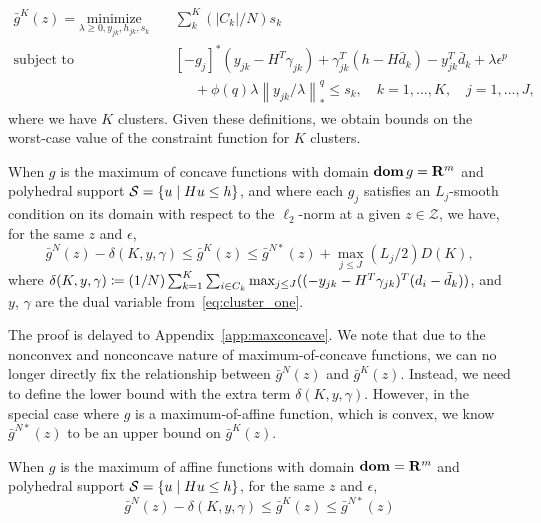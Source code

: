{{\begin{equation}
	\tag{MRO-K-Dual}
	\label{eq:cluster_dual}
	\begin{aligned}
		\bar{g}^K(z) = \underset{\lambda \geq 0, y_{jk},h_{jk}, s_k}{\text{minimize}} &\quad \sum_k^K  (|C_k|/N) s_k\\
	\mbox{subject to} & \quad [-g_j]^*(y_{jk} - H^T\gamma_{jk})+ \gamma_{jk}^T(h-H\bar{d}_k) - y_{jk}^T\bar{d}_k + \lambda \epsilon^p   \\
	& \hspace{1cm} + \phi(q)\lambda \left\|y_{jk}/\lambda \right\|^q_*\le s_k, \quad k = 1,\dots,K, \quad j = 1,\dots,J,
\end{aligned}
\end{equation}
where we have $K$ clusters.
Given these definitions, we obtain bounds on the worst-case value of the constraint function for $K$ clusters.
\begin{theorem}
	\label{thm:maxconcave}
	When $g$ is the maximum of concave functions with domain ${\mathop{\bf dom}{g}= {\mathbf R}^m}$ and polyhedral support $\mathcal{S} = \{u \mid Hu\leq h\}$, and where each $g_j$ satisfies an $L_j$-smooth condition on its domain with respect to the $\ell_2$-norm at a given $z \in \mathcal{Z}$, we have, for the same $z$ and $\epsilon$,
	\begin{equation*}
		\bar{g}^{N}(z) -\delta(K,y,\gamma) \leq \bar{g}^K(z) \leq  \bar{g}^{N*}(z) + \max_{j\leq J} (L_j/2)D(K),
	\end{equation*}
	where $\delta(K,y,\gamma) \coloneqq (1/N)\sum_{k=1}^K \sum_{i \in C_k}  \max_{j\leq J}((-y_{jk} -H^T\gamma_{jk})^T(d_i - \bar{d}_k))$, and $y$, $\gamma$ are the dual variable from~\eqref{eq:cluster_one}. 
	\end{theorem}
	The proof is delayed to Appendix~\ref{app:maxconcave}. We note that due to the nonconvex and nonconcave nature of maximum-of-concave functions, we can no longer directly fix the relationship between $\bar{g}^{N}(z)$ and $\bar{g}^{K}(z)$. Instead, we need to define the lower bound with the extra term $\delta(K,y,\gamma)$.
	However, in the special case where $g$ is a maximum-of-affine function, which is convex, we know $\bar{g}^{N*}(z)$ to be an upper bound on $\bar{g}^{K}(z)$.
	\begin{corollary}
		\label{cor:maxaffine}
		When $g$ is the maximum of affine functions with domain $\mathop{\bf dom} = {\mathbf R}^m$ and polyhedral support $\mathcal{S} = \{u \mid Hu\leq h\}$, for the same $z$ and $\epsilon$,
		\begin{equation*}
			\bar{g}^{N}(z) -\delta(K,y,\gamma)  \leq \bar{g}^K(z) \leq \bar{g}^{N*}(z) 

\end{equation*}
\end{corollary}}}
